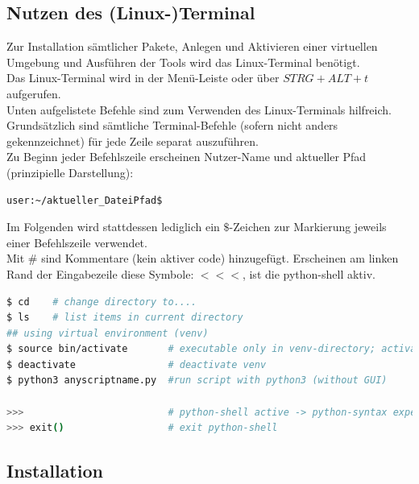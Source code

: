 \documentclass[
a4paper,     %
12pt         %
]{scrartcl}  %
\begin{document}
\subsection{Nutzen des (Linux-)Terminal}
Zur Installation sämtlicher Pakete, Anlegen und Aktivieren einer virtuellen Umgebung und Ausführen der Tools wird das Linux-Terminal benötigt.\\
Das Linux-Terminal wird in der Menü-Leiste oder über $STRG + ALT +t$ aufgerufen.\\
Unten aufgelistete Befehle sind zum Verwenden des Linux-Terminals hilfreich.\\
Grundsätzlich sind sämtliche Terminal-Befehle (sofern nicht anders gekennzeichnet) für jede Zeile separat auszuführen.\\ Zu Beginn jeder Befehlszeile erscheinen Nutzer-Name und aktueller Pfad (prinzipielle Darstellung):
\begin{lstlisting}
user:~/aktueller_DateiPfad$
\end{lstlisting} 
Im Folgenden wird stattdessen lediglich ein $\$$-Zeichen zur Markierung jeweils einer Befehlszeile verwendet.\\
Mit $\#$ sind Kommentare (kein aktiver code) hinzugefügt. Erscheinen am linken Rand der Eingabezeile diese Symbole: $<<<$, ist die python-shell aktiv.
\begin{lstlisting}[language=bash]
$ cd 	# change directory to....
$ ls 	# list items in current directory
## using virtual environment (venv)
$ source bin/activate 		# executable only in venv-directory; activate venv 
$ deactivate 				# deactivate venv
$ python3 anyscriptname.py 	#run script with python3 (without GUI)

>>> 						# python-shell active -> python-syntax expected
>>> exit() 					# exit python-shell
\end{lstlisting}

\subsection{Installation}
\end{document}
